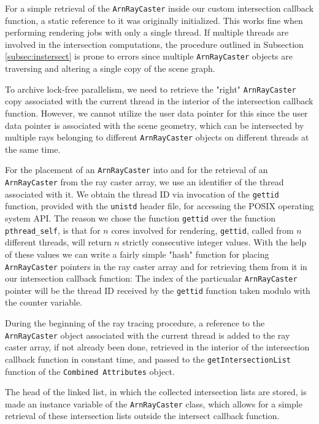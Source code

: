 For a simple retrieval of the \texttt{ArnRayCaster} inside our custom intersection callback function, a static reference to it was originally initialized. This works fine when performing rendering jobs with only a single thread. If multiple threads are involved in the intersection computations, the procedure outlined in Subsection \ref{subsec:instersect} is prone to errors since multiple \texttt{ArnRayCaster} objects are traversing and altering a single copy of the scene graph.

To archive lock-free parallelism, we need to retrieve the "right" \texttt{ArnRayCaster} copy associated with the current thread in the interior of the intersection callback function. However, we cannot utilize the user data pointer for this since the user data pointer is associated with the scene geometry, which can be intersected by multiple rays belonging to different \texttt{ArnRayCaster} objects on different threads at the same time.

For the placement of an \texttt{ArnRayCaster} into and for the retrieval of an \texttt{ArnRayCaster} from the ray caster array, we use an identifier of the thread associated with it. We obtain the thread ID via invocation of the \texttt{gettid} function, provided with the \texttt{unistd} header file, for accessing the POSIX operating system API. The reason we chose the function \texttt{gettid} over the function \texttt{pthread\_self}, is that for $n$ cores involved for rendering, \texttt{gettid}, called from $n$ different threads, will return $n$ strictly consecutive integer values. With the help of these values we can write a fairly simple "hash" function for placing \texttt{ArnRayCaster} pointers in the ray caster array and for retrieving them from it in our intersection callback function: The index of the particualar \texttt{ArnRayCaster} pointer will be the thread ID received by the \texttt{gettid} function taken modulo with the counter variable.

During the beginning of the ray tracing procedure, a reference to the  \texttt{ArnRayCaster} object associated with the current thread is added to the ray caster array, if not already been done, retrieved in the interior of the intersection callback function in constant time, and passed to the \texttt{getIntersectionList} function of the \texttt{Combined Attributes} object. 

The head of the linked list, in which the collected intersection lists are stored, is made an instance variable of the \texttt{ArnRayCaster} class, which allows for a simple retrieval of these intersection lists outside the intersect callback function. 

